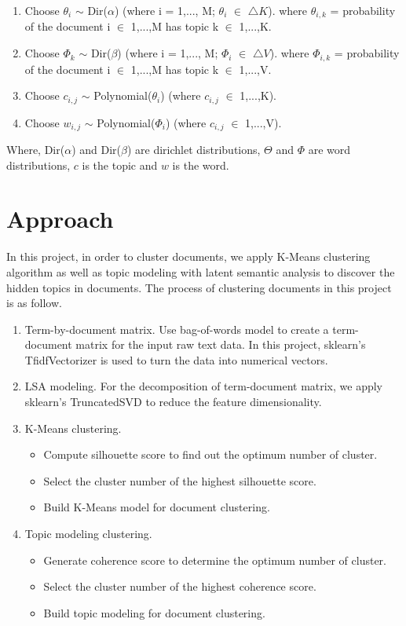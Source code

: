\documentclass[12pt]{article}
\begin{document}
\begin{enumerate}
	\item  Choose $\theta_i$ $\sim$ Dir($\alpha$) (where i = 1,..., M; $\theta_i$ $\in$ $\triangle K$).
	where $\theta_{i,k}$ = probability of the document i $\in$ {1,...,M} has topic k $\in$ {1,...,K}.
	\item Choose $\Phi_k$ $\sim$ Dir($\beta$) (where i = 1,..., M; $\Phi_i$ $\in$ $\triangle V$).
	where $\Phi_{i,k}$ = probability of the document i $\in$ {1,...,M} has topic k $\in$ {1,...,V}.
	\item Choose $c_{i,j}$ $\sim$ Polynomial($\theta_i$) (where $c_{i,j}$ $\in$ {1,...,K}).
	\item Choose $w_{i,j}$ $\sim$ Polynomial($\Phi_i$) (where $c_{i,j}$ $\in$ {1,...,V}).
\end{enumerate}
Where, Dir($\alpha$) and Dir($\beta$) are dirichlet distributions, $\Theta$ and $\Phi$ are word distributions, $c$ is the topic and $w$ is the word. 
\section{Approach}
In this project, in order to cluster documents, we apply K-Means clustering algorithm as well as topic modeling with latent semantic analysis to discover the hidden topics in documents. The process of clustering documents in this project is as follow. 
\begin{enumerate}
	\item Term-by-document matrix. Use bag-of-words model to create a term-document matrix for the input raw text data. In this project, sklearn’s TfidfVectorizer is used to turn the data into  numerical vectors.
	\item LSA modeling. For the decomposition of term-document matrix, we apply sklearn's TruncatedSVD to reduce the feature dimensionality.
	\item K-Means clustering. 
	\begin{itemize}
		\item Compute silhouette score to find out the optimum number of cluster.
		\item Select the cluster number of the highest silhouette score.
		\item Build K-Means model for document clustering.
	\end{itemize}
	\item Topic modeling clustering. 
		\begin{itemize}
		\item Generate coherence score to determine the optimum number of cluster.
		\item Select the cluster number of the highest coherence score.
		\item Build topic modeling for document clustering.
	\end{itemize}
\end{enumerate}
\end{document}

